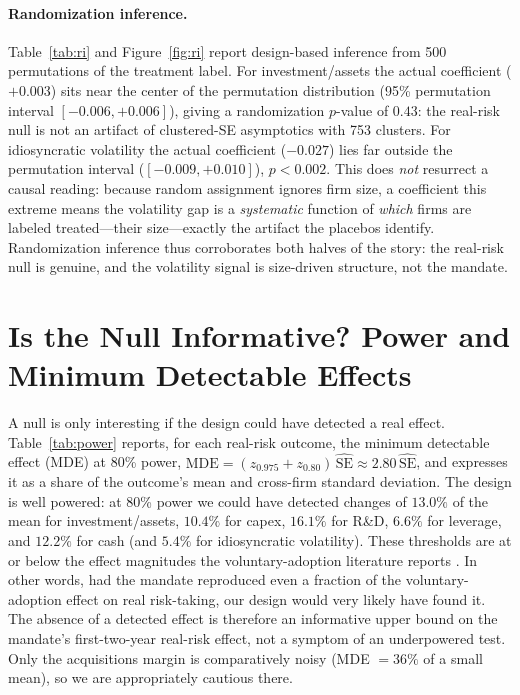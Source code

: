 \documentclass[12pt]{article}
\begin{document}
\paragraph{Randomization inference.} Table~\ref{tab:ri} and Figure~\ref{fig:ri} report
design-based inference from 500 permutations of the treatment label. For investment/assets the
actual coefficient ($+0.003$) sits near the center of the permutation distribution (95\%
permutation interval $[-0.006,+0.006]$), giving a randomization $p$-value of $0.43$: the
real-risk null is not an artifact of clustered-SE asymptotics with 753 clusters. For
idiosyncratic volatility the actual coefficient ($-0.027$) lies far outside the permutation
interval ($[-0.009,+0.010]$), $p<0.002$. This does \emph{not} resurrect a causal reading:
because random assignment ignores firm size, a coefficient this extreme means the
volatility gap is a \emph{systematic} function of \emph{which} firms are labeled treated---their
size---exactly the artifact the placebos identify. Randomization inference thus corroborates
both halves of the story: the real-risk null is genuine, and the volatility signal is
size-driven structure, not the mandate.

\section{Is the Null Informative? Power and Minimum Detectable Effects}\label{sec:power}
A null is only interesting if the design could have detected a real effect. Table~\ref{tab:power}
reports, for each real-risk outcome, the minimum detectable effect (MDE) at 80\% power,
$\text{MDE}=(z_{0.975}+z_{0.80})\,\widehat{\text{SE}}\approx 2.80\,\widehat{\text{SE}}$, and
expresses it as a share of the outcome's mean and cross-firm standard deviation. The design is
well powered: at 80\% power we could have detected changes of $13.0\%$ of the mean for
investment/assets, $10.4\%$ for capex, $16.1\%$ for R\&D, $6.6\%$ for leverage, and $12.2\%$ for
cash (and $5.4\%$ for idiosyncratic volatility). These thresholds are at or below the effect
magnitudes the voluntary-adoption literature reports \citep{liu2020,babenko2023}. In other words,
had the mandate reproduced even a fraction of the voluntary-adoption effect on real risk-taking,
our design would very likely have found it. The absence of a detected effect is therefore an
informative upper bound on the mandate's first-two-year real-risk effect, not a symptom of an
underpowered test. Only the acquisitions margin is comparatively noisy (MDE $=36\%$ of a small
mean), so we are appropriately cautious there.
\end{document}
